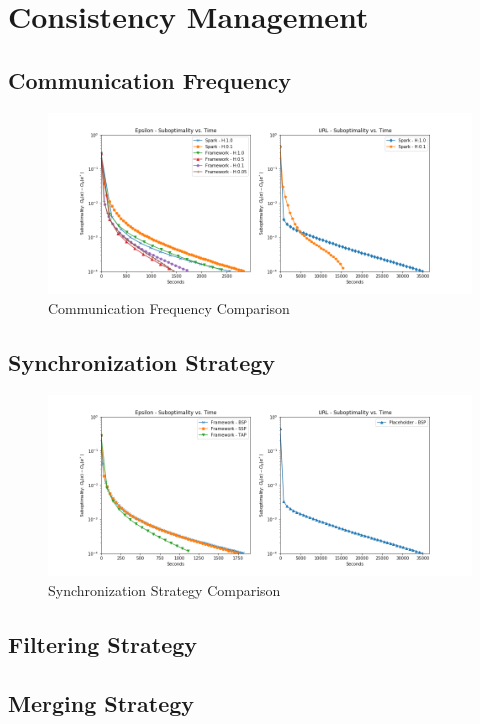 \section{Consistency Management}


\subsection{Communication Frequency}
\begin{figure}[ht]
\centering
\includegraphics[width=1.0\textwidth]{img/comm_freq_cmp.png}
\caption{Communication Frequency Comparison}
\label{fig:comm_freq_cmp}
\end{figure}

\subsection{Synchronization Strategy}
\begin{figure}[ht]
\centering
\includegraphics[width=1.0\textwidth]{img/sync_strat_cmp.png}
\caption{Synchronization Strategy Comparison}
\label{fig:sync_start_cmp}
\end{figure}

\subsection{Filtering Strategy}

\subsection{Merging Strategy}
